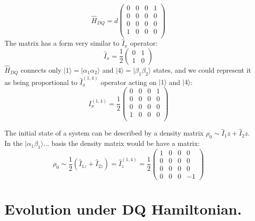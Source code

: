 \documentclass[a4paper, 12pt]{article}
\begin{document}
\begin{equation}
\hat{H}_{DQ} = d\left(
\begin{array}{cccc}
0 & 0 & 0 & 1 \\
0 & 0 & 0 & 0 \\
0 & 0 & 0 & 0 \\
1 & 0 & 0 & 0 \\
\end{array}
\right)
\end{equation}
The matrix has a form very similar to $\hat{I}_x$ operator:
\begin{equation}
\hat{I}_x = \frac{1}{2}\left(
\begin{array}{cc}
  0 & 1\\
  1 & 0
\end{array}
\right)
\end{equation}
$\hat{H}_{DQ}$ connects only $\vert 1 \rangle = \vert \alpha_1 \alpha_2 \rangle$ and $\vert 4 \rangle = \vert \beta_1 \beta_2 \rangle$ states, and we could represent it as being proportional to $ \hat{I}_{x}^{(1,4)} $ operator acting on $\vert 1 \rangle$  and $\vert 4 \rangle$:
\begin{equation}
 I_{x}^{(1,4)} = \frac{1}{2} \left(
\begin{array}{cccc}
0 & 0 & 0 & 1 \\
0 & 0 & 0 & 0 \\
0 & 0 & 0 & 0 \\
1 & 0 & 0 & 0 \\
\end{array}
 \right)
\end{equation}

The initial state of a system can be described by a density matrix $\rho_0 \sim \hat{I}_1z + \hat{I}_2z$. In the $\vert \alpha_1 \beta_1 \rangle...$ basis the density matrix would be have a matrix: 
\begin{equation}
\rho_0 \sim \frac{1}{2}(\hat{I}_{1z} + \hat{I}_{2z}) = \hat{I}_{z}^{(1,4)} = \frac{1}{2} \left(
 \begin{array}{cccc}
 1 & 0 & 0 & 0 \\
 0 & 0 & 0 & 0 \\
 0 & 0 & 0 & 0 \\
 0 & 0 & 0 & -1  
 \end{array}
\right)
\end{equation}

\section{Evolution under DQ Hamiltonian.}
\end{document}
